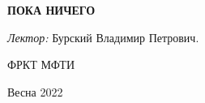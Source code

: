 \begin{titlepage}
    \begin{center}
        \vspace*{1cm}
        {\bf \Huge ПОКА НИЧЕГО}
        \vspace*{1cm}

        {\large \textit{Лектор:} Бурский Владимир Петрович.}

        \vfill

        ФРКТ МФТИ

        Весна 2022

        \vspace{1cm}
    \end{center}
\end{titlepage}
